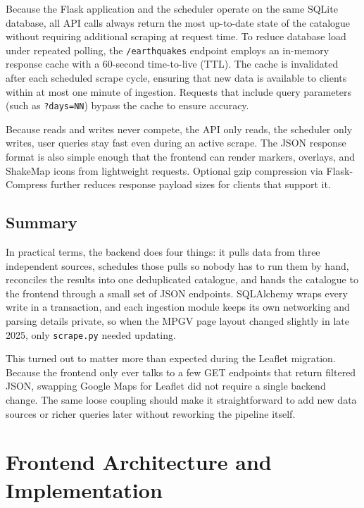 \documentclass[12pt]{article}
\begin{document}
Because the Flask application and the scheduler operate on the same SQLite database, all API calls always return the most up-to-date state of the catalogue without requiring additional scraping at request time. To reduce database load under repeated polling, the \texttt{/earthquakes} endpoint employs an in-memory response cache with a 60-second time-to-live (TTL). The cache is invalidated after each scheduled scrape cycle, ensuring that new data is available to clients within at most one minute of ingestion. Requests that include query parameters (such as \texttt{?days=NN}) bypass the cache to ensure accuracy.

Because reads and writes never compete, the API only reads, the scheduler only writes, user queries stay fast even during an active scrape. The JSON response format is also simple enough that the frontend can render markers, overlays, and ShakeMap icons from lightweight requests. Optional gzip compression via Flask-Compress further reduces response payload sizes for clients that support it.

\subsection{Summary}

In practical terms, the backend does four things: it pulls data from three independent sources, schedules those pulls so nobody has to run them by hand, reconciles the results into one deduplicated catalogue, and hands the catalogue to the frontend through a small set of JSON endpoints. SQLAlchemy wraps every write in a transaction, and each ingestion module keeps its own networking and parsing details private, so when the MPGV page layout changed slightly in late 2025, only \texttt{scrape.py} needed updating.

This turned out to matter more than expected during the Leaflet migration. Because the frontend only ever talks to a few GET endpoints that return filtered JSON, swapping Google Maps for Leaflet did not require a single backend change. The same loose coupling should make it straightforward to add new data sources or richer queries later without reworking the pipeline itself.

\newpage

\section{Frontend Architecture and Implementation}
\label{sec:frontend}
\end{document}
